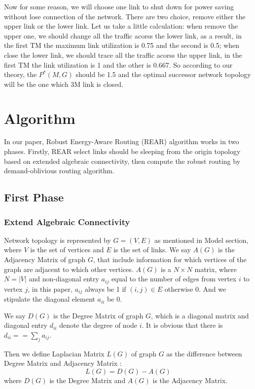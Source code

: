 \documentclass[conference]{IEEEtran}
\begin{document}
Now for some reason, we will choose one link to shut down for power saving without lose connection of the network. 
There are two choice, remove either the upper link or the lower link. Let us take a little calculation: when 
remove the upper one, we should change all the traffic acorss the lower link, as a result, in the first  
TM the maximum link utilization is 0.75 and the second is 0.5; when close the lower link, we should trace all the 
traffic acorss the upper link, in the first TM the link utilization is 1 and the other is 0.667. 
So according to our theory, the $P^{*}(M, G)$ should be 1.5 and the optimal successor network topology will be
the one which 3M link is closed.

\section{Algorithm}
In our paper, Robust Energy-Aware Routing (REAR) algorithm works in two phases. Firstly, REAR select links 
should be sleeping from the origin topology based on extended algebraic connectivity, then compute the robust 
routing by demand-oblivious routing algorithm.

\subsection{First Phase}

\subsubsection{Extend Algebraic Connectivity}
Network topology is represented by $G = (V, E)$ as mentioned in Model section, where $V$ is the set of vertices
and $E$ is the set of links. We say $A(G)$ is the Adjacency Matrix of graph $G$, that include information for which
vertices of the graph are adjacent to which other vertices. $A(G)$ is a $N \times N$ matrix, where
$N = |V|$ and non-diagonal entry $a_{ij}$ equal to the number of edges from vertex $i$ to vertex $j$, in this paper,
$a_{ij}$ always be 1 if $(i,j) \in E$ otherwise 0. And we stipulate the diagonal element $a_{ii}$ be 0.


We say $D(G)$ is the Degree Matrix of graph $G$, which is a diagonal matrix and diagonal entry $d_{ii}$ denote 
the degree of node $i$. It is obvious that there is $d_{ii} == \sum_{j} a_{ij}$.


Then we define Laplacian Matrix $L(G)$ of graph $G$ as the difference between Degree Matrix and Adjacency Matrix :
\begin{equation}
	L(G) = D(G) - A(G)
\end{equation}
where $D(G)$ is the Degree Matrix and $A(G)$ is the Adjacency Matrix.
\end{document}
